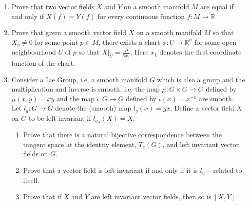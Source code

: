 \begin{enumerate}
\item Prove that two vector fields $X$ and $Y$ on a smooth manifold $M$ are equal if and only if $X(f)= Y(f)$ for every continuous function $f : M \to \mathbb{R}$
  \item Prove that given a smooth vector field $X$ on a smooth manifold $M$ so that $X_p\neq 0$ for some point $p \in M$, there exists a chart $\phi : U \to \mathbb{R}^n$ for some open neighbourhood $U$ of $p$ so that $X|_U = \frac{\partial}{\partial x_1}$. Here $x_1$ denotes the first coordinate function of the chart.
    \item Consider a Lie Group, i.e. a smooth manifold $G$ which is also a group and the multiplication and inverse is smooth, i.e. the map $\mu : G \times G\to G$ defined by $\mu(x,y) = xy$ and the map $\iota : G \to G$ defined by $\iota(x) = x^{-1}$ are smooth.
Let $l_g : G \to G$ denote the (smooth) map $l_g(x) = gx$. Define a vector field $X$ on $G$ to be left invariant if ${l_g}_*(X) = X$.
      \begin{enumerate}
        \item Prove that there is a natural bijective correspondence between the tangent space at the identity element, $T_e(G)$, and left invariant vector fields on $G$.
          \item Prove that a vector field is left invariant if and only if it is $l_g-$related to itself.
            \item Prove that if $X$ and $Y$ are left invariant vector fields, then so is $[X, Y]$.
      \end{enumerate}
\end{enumerate}
